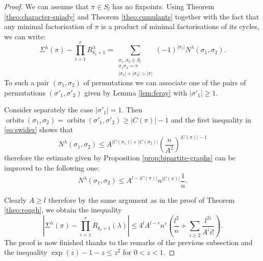 \documentclass[12pt]{amsart}
\theoremstyle{plain}
\theoremstyle{remark}
\DeclareMathOperator{\supp}{supp}
\DeclareMathOperator{\orbits}{orbits}
\begin{document}
\begin{proof}
We can assume that $\pi\in S_l$ has no fixpoints.
Using Theorem \ref{theo:character-sniady} and Theorem \ref{theo:cumulants}
together with the fact that any minimal factorisation of $\pi$ is a product
of minimal factorisations of its cycles, we can write:
$$\Sigma^\lambda(\pi) - \prod_{i=1}^r R_{k_i+1}^\lambda =
\sum_{\substack{\sigma_1,\sigma_2 \in S_l \\ \sigma_1 \sigma_2 = \pi \\
|\sigma_1| + |\sigma_2| > |\pi|}} (-1)^{|\sigma_1|}
N^\lambda(\sigma_1,\sigma_2).$$
To such a pair $(\sigma_1,\sigma_2)$ of permutations we can associate
one of the pairs of permutations $(\sigma'_1,\sigma'_2)$ given by Lemma
\ref{lem:feray} with $|\sigma'_1| \geq 1$.

Consider separately the case $|\sigma'_1|=1$. Then $\orbits(\sigma_1,\sigma_2)=
\orbits(\sigma'_1,\sigma'_2) \geq |C(\pi)|-1 $ and the first inequality in
\eqref{eq:swider} shows that
$$N^\lambda(\sigma_1,\sigma_2)  \leq 
A^{|C(\sigma_1)|+|C(\sigma_2)|}\left(\frac{n}{A^2}\right)^{|C(\pi)|-1} $$
therefore the estimate given by
% 
% 
% 
% 
% 
% 
Proposition \ref{prop:bipartite-graphs} can be improved to the following
one:
$$N^\lambda(\sigma_1,\sigma_2) \leq A^{l-|C(\pi)|}n^{|C(\pi)|} \frac{1}{n}.$$

Clearly $A\geq l$ therefore by the same
argument as in the proof of Theorem \ref{theo:rough}, we obtain the inequality
$$\left|\Sigma^\lambda(\pi) - \prod_{i=1}^r R_{k_i+1}(\lambda) \right| \leq 4^l
A^{l-r} n^r \left(\frac{l^2}{n} + \sum_{i \geq 2} \frac{l^{2i}}{A^i
i!}\right).$$
The proof is now finished thanks to the remarks of the previous subsection and the
inequality $\exp(z)-1-z \leq z^2$ for $0<z<1$.
% 
\end{proof}
\end{document}
